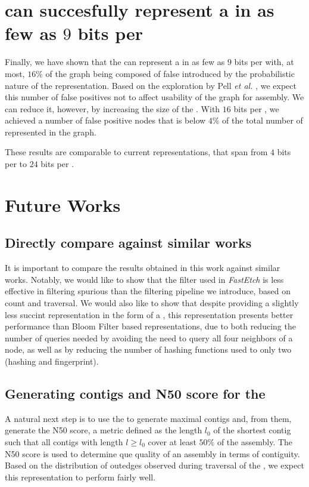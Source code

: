 \section{\dBHT can succesfully represent a \dBG in as few as $9$ bits per \kmer}

Finally, we have shown that the \dBHT can represent a \dBG in as few as $9$ bits per \kmer with, at most, $16\%$ of the graph being composed of false  introduced by the probabilistic nature of the representation. Based on the exploration by Pell \emph{et al.} \cite{Pell2012}, we expect this number of false positives not to affect usability of the graph for assembly. We can reduce it, however, by increasing the size of the \dBHT. With $16$ bits per \kmer, we achieved a number of false positive nodes that is below $4\%$ of the total number of  represented in the graph.

These results are comparable to current \dBG representations, that span from $4$ bits per \kmer to $24$ bits per \kmer \cite{Chikhi2013} \cite{Giani2020}.

\section{Future Works}

\subsection{Directly compare against similar works}

It is important to compare the results obtained in this work against similar works. Notably, we would like to show that the  filter used in \emph{FastEtch} is less effective in filtering spurious  than the filtering pipeline we introduce, based on count and traversal. We would also like to show that despite providing a slightly less succint \dBG representation in the form of a \dBHT, this representation presents better performance than Bloom Filter based representations, due to both reducing the number of queries needed by avoiding the need to query all four neighbors of a node, as well as by reducing the number of hashing functions used to only two (hashing and fingerprint).

\subsection{Generating contigs and N50 score for the \dBHT}

A natural next step is to use the \dBHT to generate maximal contigs and, from them, generate the N50 score, a metric defined as the length $l_0$ of the shortest contig such that all contigs with length $l \geq l_0$ cover at least $50\%$ of the assembly. The N50 score is used to determine que quality of an assembly in terms of contiguity. Based on the distribution of outedges observed during traversal of the \dBHT, we expect this representation to perform fairly well.

